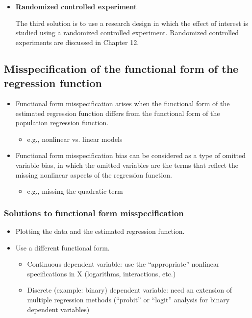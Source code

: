 \documentclass[a4paper,11pt]{article}
\begin{document}
\begin{itemize}
\item \textbf{Randomized controlled experiment}
\label{sec:org4205210}

The third solution is to use a research design in which the effect of
interest is studied using a randomized controlled
experiment. Randomized controlled experiments are discussed in
Chapter 12.
\end{itemize}

\subsection{Misspecification of the functional form of the regression function}
\label{sec:org2609c79}
\begin{itemize}
\item Functional form misspecification arises when the functional form of
the estimated regression function differs from the functional form of
the population regression function. 
\begin{itemize}
\item e.g., nonlinear vs. linear models
\end{itemize}
\item Functional form misspecification bias can be considered as a type of
omitted variable bias, in which the omitted variables are the terms
that reflect the missing nonlinear aspects of the regression
function. 
\begin{itemize}
\item e.g., missing the quadratic term
\end{itemize}
\end{itemize}

\subsubsection*{Solutions to functional form misspecification}
\label{sec:org0084eb0}
\begin{itemize}
\item Plotting the data and the estimated regression function.
\item Use a different functional form.
\begin{itemize}
\item Continuous dependent variable:  use the “appropriate” nonlinear
specifications in X (logarithms, interactions, etc.)
\item Discrete (example: binary) dependent variable:  need an extension of
multiple regression methods (“probit” or “logit” analysis for binary
dependent variables)
\end{itemize}
\end{itemize}
\end{document}
